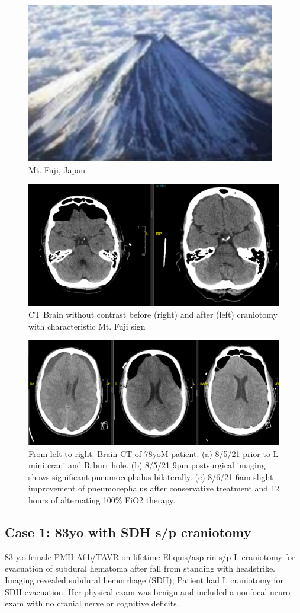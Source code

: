 \documentclass[fleqn,10pt]{olplainarticle}
\begin{document}
\begin{figure}[ht]
\centering
\includegraphics[width=0.3\linewidth]{Fuji}
\caption{Mt. Fuji, Japan}
\label{fig:Fuji}
\end{figure}

\begin{figure}[ht]
\centering
\includegraphics[width=0.7\linewidth]{CT}
\caption{CT Brain without contrast before (right) and after (left) craniotomy with characteristic Mt. Fuji sign}
\label{fig:view}
\end{figure}

\begin{figure}[ht]
\centering
\includegraphics[width=0.8\linewidth]{CTfig2}
\caption{From left to right: Brain CT of 78yoM patient. 
(a) 8/5/21 prior to L mini crani and R burr hole. (b) 8/5/21 9pm postsurgical imaging shows significant pneumocephalus bilaterally. (c) 8/6/21 6am slight improvement of pneumocephalus after conservative treatment and 12 hours of alternating 100\% FiO2 therapy. }
\label{fig:view2}
\end{figure}

\subsection*{Case 1: 83yo with SDH s/p craniotomy}
83 y.o.female PMH Afib/TAVR on lifetime Eliquis/aspirin s/p L craniotomy for evacuation of subdural hematoma after fall from standing with headstrike. Imaging revealed subdural hemorrhage (SDH); Patient had L craniotomy for SDH evacuation. Her physical exam was benign and included a nonfocal neuro exam with no cranial nerve or cognitive deficits. 
\end{document}
